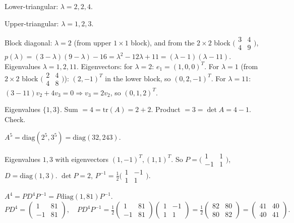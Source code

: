 \begin{solutions}
  \item Lower-triangular: $\lambda = 2, 2, 4$.
  \item Upper-triangular: $\lambda = 1, 2, 3$.
  \item Block diagonal: $\lambda = 2$ (from upper $1 \times 1$ block), and from the $2 \times 2$ block $\bigl(\begin{smallmatrix} 3 & 4 \\ 4 & 9 \end{smallmatrix}\bigr)$, $p(\lambda) = (3 - \lambda)(9 - \lambda) - 16 = \lambda^{2} - 12 \lambda + 11 = (\lambda - 1)(\lambda - 11)$. Eigenvalues $\lambda = 1, 2, 11$.
  Eigenvectors: for $\lambda = 2$: $e_{1} = (1, 0, 0)^{T}$. For $\lambda = 1$ (from $2 \times 2$ block $\bigl(\begin{smallmatrix} 2 & 4 \\ 4 & 8 \end{smallmatrix}\bigr)$): $(2, -1)^{T}$ in the lower block, so $(0, 2, -1)^{T}$. For $\lambda = 11$: $(3 - 11)v_{2} + 4 v_{3} = 0 \Rightarrow v_{3} = 2 v_{2}$, so $(0, 1, 2)^{T}$.
  \item Eigenvalues $\{1, 3\}$. Sum $= 4 = \mathrm{tr}(A) = 2 + 2$. Product $= 3 = \det A = 4 - 1$. Check.
  \item $A^{5} = \mathrm{diag}(2^{5}, 3^{5}) = \mathrm{diag}(32, 243)$.
  \item Eigenvalues $1, 3$ with eigenvectors $(1, -1)^{T}, (1, 1)^{T}$. So $P = \bigl(\begin{smallmatrix} 1 & 1 \\ -1 & 1 \end{smallmatrix}\bigr)$, $D = \mathrm{diag}(1, 3)$. $\det P = 2$, $P^{-1} = \tfrac{1}{2}\bigl(\begin{smallmatrix} 1 & -1 \\ 1 & 1 \end{smallmatrix}\bigr)$.
  \item $A^{4} = P D^{4} P^{-1} = P \mathrm{diag}(1, 81) P^{-1}$.
  \[
  P D^{4} = \begin{pmatrix} 1 & 81 \\ -1 & 81 \end{pmatrix}, \quad P D^{4} P^{-1} = \tfrac{1}{2}\begin{pmatrix} 1 & 81 \\ -1 & 81 \end{pmatrix} \begin{pmatrix} 1 & -1 \\ 1 & 1 \end{pmatrix} = \tfrac{1}{2}\begin{pmatrix} 82 & 80 \\ 80 & 82 \end{pmatrix} = \begin{pmatrix} 41 & 40 \\ 40 & 41 \end{pmatrix}.
\]
\end{solutions}
